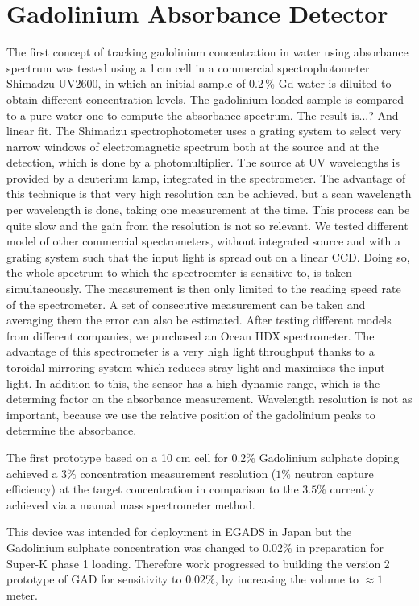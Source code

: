 \section{Gadolinium Absorbance Detector}

The first concept of tracking gadolinium concentration in water using absorbance spectrum %
was tested using a 1\,cm cell in a commercial spectrophotometer Shimadzu UV2600, %
in which an initial sample of 0.2\,\% Gd water is diluited to obtain different concentration levels.
The gadolinium loaded sample is compared to a pure water one to compute the absorbance spectrum.
The result is...? And linear fit.
The Shimadzu spectrophotometer uses a grating system to select very narrow windows of electromagnetic spectrum %
both at the source and at the detection, which is done by a photomultiplier.
The source at UV wavelengths is provided by a deuterium lamp, integrated in the spectrometer.
The advantage of this technique is that very high resolution can be achieved, %
but a scan wavelength per wavelength is done, taking one measurement at the time.
This process can be quite slow and the gain from the resolution is not so relevant.
We tested different model of other commercial spectrometers, without integrated source and %
with a grating system such that the input light is spread out on a linear CCD.
Doing so, the whole spectrum to which the spectroemter is sensitive to, is taken simultaneously.
The measurement is then only limited to the reading speed rate of the spectrometer.
A set of consecutive measurement can be taken and averaging them the error can also be estimated.
After testing different models from different companies, we purchased an Ocean HDX spectrometer.
The advantage of this spectrometer is a very high light throughput thanks to a toroidal mirroring system %
which reduces stray light and maximises the input light.
In addition to this, the sensor has a high dynamic range, which is the determing factor %
on the absorbance measurement.
Wavelength resolution is not as important, because we use the relative position of the gadolinium peaks %
to determine the absorbance.



The first prototype based on a 10 cm cell for 0.2$\%$ Gadolinium sulphate doping achieved %
a $3\%$ concentration measurement resolution ($1\%$ neutron capture efficiency) %
at the target concentration in comparison to the $3.5\%$ currently achieved via a manual mass spectrometer method.

This device was intended for deployment in EGADS in Japan but the Gadolinium sulphate %
concentration was changed to $0.02\%$ in preparation for Super-K phase 1 loading.
Therefore work progressed to building the version 2 prototype of GAD for %
sensitivity to $0.02\%$, by increasing the volume to $\approx 1$ meter.

